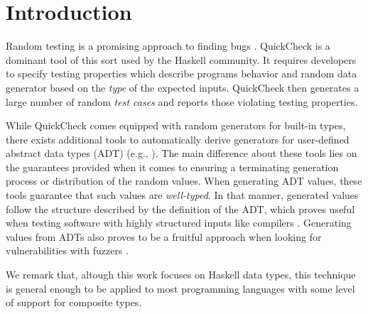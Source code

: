 \section{Introduction}

Random testing is a promising approach to finding bugs
\cite{HughesNSA16,HughesPAN16,ArtsHNS15}.
%
QuickCheck \cite{ClaessenH00} is a dominant tool of this sort used by the
Haskell community.
%
It requires developers to specify testing properties which describe programs
behavior and random data generator based on the \emph{type} of the expected
inputs. %
%
QuickCheck then generates a large number of random \emph{test cases} and reports
those violating testing properties.
%

While QuickCheck comes equipped with random generators for built-in types, there
exists additional tools to automatically derive generators for user-defined
abstract data types (ADT) (e.g.,
\cite{mitchell2007,RuncimanNL08,DuregardJW12,grieco2017,DBLP:conf/haskell/MistaRH18}).
%
The main difference about these tools lies on the guarantees provided when it
comes to ensuring a terminating generation process or distribution of the random
values.
%
When generating ADT values, these tools guarantee that such values are
\emph{well-typed}.
%
In that manner, generated values follow the structure described by the
definition of the ADT, which proves useful when testing software with highly
structured inputs like compilers \cite{Palka11,MidtgaardJKNN17}.
%
Generating values from ADTs also proves to be a fruitful approach when looking
for vulnerabilities with fuzzers \cite{GriecoCB16,grieco2017}.
%




We remark that, altough this work focuses on Haskell data types, this technique
is general enough to be applied to most programming languages with some level of
support for composite types.


